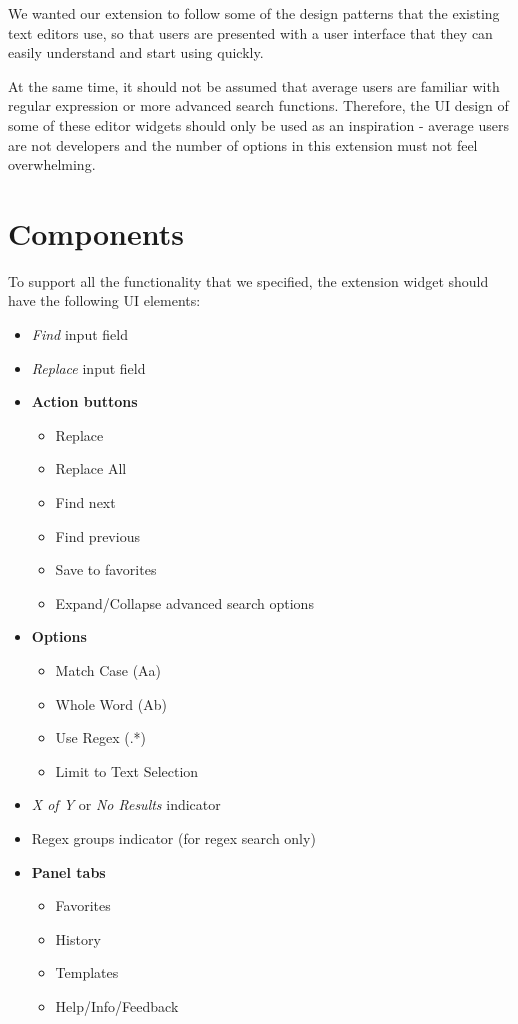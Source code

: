 \documentclass[bsc,frontabs,twoside,singlespacing,parskip,deptreport]{infthesis}
\providecommand{\tightlist}{%
  \setlength{\itemsep}{0pt}\setlength{\parskip}{0pt}}
\begin{document}
We wanted our extension to follow some of the design patterns that the existing text editors use, so that users are presented with a user interface that they can easily understand and start using quickly.

At the same time, it should not be assumed that average users are familiar with regular expression or more advanced search functions. Therefore, the UI design of some of these editor widgets should only be used as an inspiration - average users are not developers and the number of options in this extension must not feel overwhelming.

\section{Components}
To support all the functionality that we specified, the extension widget should have the following UI elements:
\begin{itemize}
\tightlist
\item
  \textit{Find} input field
\item
  \textit{Replace} input field
\item
  \textbf{Action buttons}

  \begin{itemize}
  \tightlist
  \item
    Replace
  \item
    Replace All
  \item
    Find next
  \item
    Find previous
  \item
    Save to favorites
  \item
  	Expand/Collapse advanced search options
  \end{itemize}
\item
  \textbf{Options}

  \begin{itemize}
  \tightlist
  \item
    Match Case (Aa)
  \item
    Whole Word (Ab\textbar{})
  \item
    Use Regex (.*)
  \item
    Limit to Text Selection
  \end{itemize}
\item
  \textit{X of Y} or \textit{No Results} indicator
\item
  Regex groups indicator (for regex search only)
\item
  \textbf{Panel tabs}

  \begin{itemize}
  \item
    Favorites
  \item
    History
  \item
    Templates
  \item
    Help/Info/Feedback
  \end{itemize}
\end{itemize}
\end{document}
